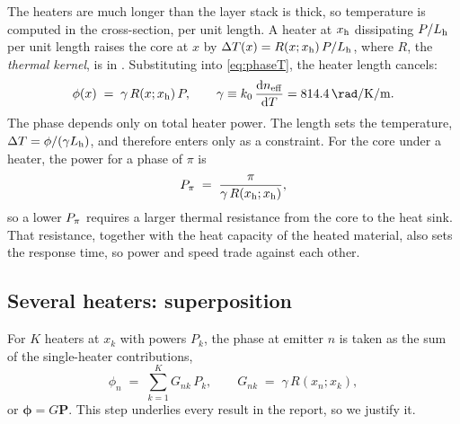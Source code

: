 The heaters are much longer than the layer stack is thick, so temperature is computed in the cross-section, per
unit length. A heater at $x_{\mathrm{h}}$ dissipating $P/L_{\mathrm{h}}$ per unit length raises the core at $x$ by
$\Delta T(x)=R(x;x_{\mathrm{h}})\,P/L_{\mathrm{h}}$, where $R$, the \emph{thermal kernel}, is in \unit{\KmW}. Substituting into
\cref{eq:phaseT}, the heater length cancels:
\begin{equation}
  \phi(x) \;=\; \gamma\,R(x;\xh)\,P,
  \qquad \gamma \equiv k_0\,\frac{\dd\neff}{\dd T} = \qty{814.4}{\rad\per\kelvin\per\metre}.
  \label{eq:phaseP}
\end{equation}
The phase depends only on total heater power. The length sets the temperature, $\Delta T=\phi/(\gamma L_{\mathrm{h}})$, and
therefore enters only as a constraint. For the core under a heater, the power for a phase of $\pi$ is
\begin{equation}
  P_{\pi} \;=\; \frac{\pi}{\gamma\,R(x_{\mathrm{h}};x_{\mathrm{h}})} ,
  \label{eq:Ppi}
\end{equation}
so a lower $P_{\pi}$ requires a larger thermal resistance from the core to the heat sink. That resistance, together
with the heat capacity of the heated material, also sets the response time, so power and speed trade against each
other.

\subsection{Several heaters: superposition}
\label{sec:superposition}

For $K$ heaters at $x_k$ with powers $P_k$, the phase at emitter $n$ is taken as the sum of the single-heater
contributions,
\begin{equation}
  \phi_n \;=\; \sum_{k=1}^{K} G_{nk}\,P_k,
  \qquad
  G_{nk} \;=\; \gamma\,R(x_n;x_k),
  \label{eq:G}
\end{equation}
or $\bm\phi=G\bm P$. This step underlies every result in the report, so we justify it.

